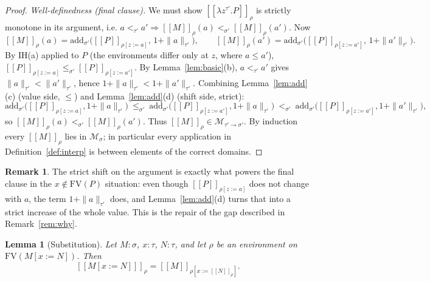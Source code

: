 \documentclass{amsart}
\newtheorem{lemma}{Lemma}
\theoremstyle{definition}
\newtheorem{remark}{Remark}
\newcommand{\interp}[1]{[\![#1]\!]}
\newcommand{\FV}{\mathrm{FV}}
\begin{document}
\begin{proof}
\emph{Well-definedness (final clause).} We must show $\interp{\lambda z^{\tau'}.P}_\rho$
is strictly monotone in its argument, i.e. $a<_{\tau'}a'\Rightarrow
\interp{M}_\rho(a)<_{\sigma'}\interp{M}_\rho(a')$. Now
\[
  \interp{M}_\rho(a)=\mathrm{add}_{\sigma'}\bigl(\interp{P}_{\rho[z:=a]},\,1+\|a\|_{\tau'}\bigr),
  \qquad
  \interp{M}_\rho(a')=\mathrm{add}_{\sigma'}\bigl(\interp{P}_{\rho[z:=a']},\,1+\|a'\|_{\tau'}\bigr).
\]
By IH(a) applied to $P$ (the environments differ only at $z$, where $a\le a'$),
$\interp{P}_{\rho[z:=a]}\le_{\sigma'}\interp{P}_{\rho[z:=a']}$. By
Lemma~\ref{lem:basic}(b), $a<_{\tau'}a'$ gives $\|a\|_{\tau'}<\|a'\|_{\tau'}$, hence
$1+\|a\|_{\tau'}<1+\|a'\|_{\tau'}$. Combining Lemma~\ref{lem:add}(c) (value side, $\le$)
and Lemma~\ref{lem:add}(d) (shift side, strict):
\[
  \mathrm{add}_{\sigma'}\!\bigl(\interp{P}_{\rho[z:=a]},1+\|a\|_{\tau'}\bigr)
  \ \le_{\sigma'}\
  \mathrm{add}_{\sigma'}\!\bigl(\interp{P}_{\rho[z:=a']},1+\|a\|_{\tau'}\bigr)
  \ <_{\sigma'}\
  \mathrm{add}_{\sigma'}\!\bigl(\interp{P}_{\rho[z:=a']},1+\|a'\|_{\tau'}\bigr),
\]
so $\interp{M}_\rho(a)<_{\sigma'}\interp{M}_\rho(a')$. Thus $\interp{M}_\rho\in
\mathcal M_{\tau'\to\sigma'}$. By induction every $\interp{M}_\rho$ lies in
$\mathcal M_\sigma$; in particular every application in Definition~\ref{def:interp} is
between elements of the correct domains.
\end{proof}

\begin{remark}
The strict shift on the argument is exactly what powers the final clause in the
$x\notin\FV(P)$ situation: even though $\interp{P}_{\rho[z:=a]}$ does not change with
$a$, the term $1+\|a\|_{\tau'}$ does, and Lemma~\ref{lem:add}(d) turns that into a strict
increase of the whole value. This is the repair of the gap described in
Remark~\ref{rem:why}.
\end{remark}

\begin{lemma}[Substitution]\label{lem:subst}
Let $M:\sigma$, $x:\tau$, $N:\tau$, and let $\rho$ be an environment on
$\FV(M[x:=N])$. Then
\[
  \interp{M[x:=N]}_\rho=\interp{M}_{\rho[x:=\interp{N}_\rho]} .
\]
\end{lemma}
\end{document}
